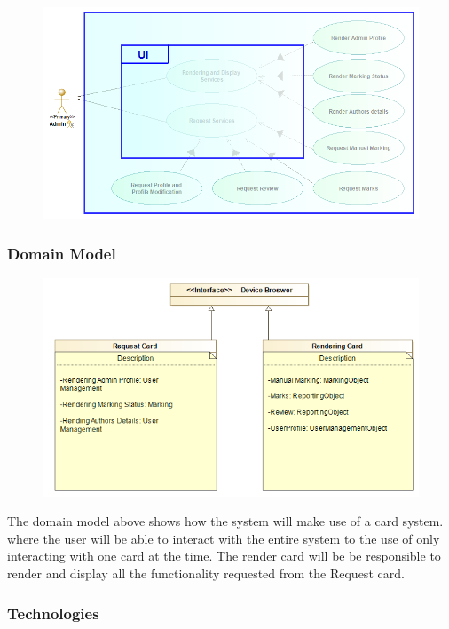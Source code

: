 \documentclass{article}
\begin{document}
			 \begin{figure}[H]
			\centering
				\includegraphics[width=450px]{Images/Access_Module/Pictures/Acess_Use_Case_Diagram_Scope}
			\end{figure}
		\subsubsection{Domain Model}
			\begin{figure}[H]
			\centering
				\includegraphics[width=450px]{Images/Access_Module/Pictures/Access_module_Class_diagram}
			\end{figure}
			
			\par The domain model above shows how the system will make use of a card system. where the user will be able 
			to interact with the entire system to the use of only interacting with one card at the time. The render 
			card will be be responsible to render and display all the functionality requested from the Request card.
		
			
		\subsubsection{Technologies}
\end{document}
